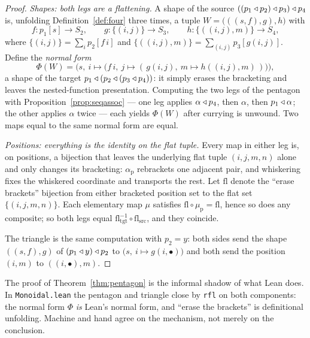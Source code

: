 \begin{proof}
\emph{Shapes: both legs are a flattening.} A shape of the source
$((p_1\mathbin{\triangleleft} p_2)\mathbin{\triangleleft} p_3)\mathbin{\triangleleft} p_4$ is, unfolding
Definition~\ref{def:four} three times, a tuple $W=\bigl(((s,f),g),h\bigr)$ with
\[
 f\colon p_1[s]\to S_2,\qquad
 g\colon\{(i,j)\}\to S_3,\qquad
 h\colon\{((i,j),m)\}\to S_4,
\]
where $\{(i,j)\}=\sum_i p_2[f\,i]$ and $\{((i,j),m)\}=\sum_{(i,j)}p_3[g(i,j)]$.
Define the \emph{normal form}
\[
  \Phi(W)=\bigl(s,\ i\mapsto\bigl(f\,i,\ j\mapsto (\,g(i,j),\ m\mapsto
   h((i,j),m)\,)\bigr)\bigr),
\]
a shape of the target $p_1\mathbin{\triangleleft}(p_2\mathbin{\triangleleft}(p_3\mathbin{\triangleleft} p_4))$: it simply erases the
bracketing and leaves the nested-function presentation. Computing the two legs
of the pentagon with Proposition~\ref{prop:seqassoc} --- one leg applies
$\alpha\mathbin{\triangleleft} p_4$, then $\alpha$, then $p_1\mathbin{\triangleleft}\alpha$; the other applies
$\alpha$ twice --- each yields $\Phi(W)$ after currying is unwound. Two maps
equal to the same normal form are equal.

\emph{Positions: everything is the identity on the flat tuple.} Every map in
either leg is, on positions, a bijection that leaves the underlying flat tuple
$(i,j,m,n)$ alone and only changes its bracketing: $\alpha_{\mathrm p}$
rebrackets one adjacent pair, and whiskering fixes the whiskered coordinate and
transports the rest. Let $\mathrm{fl}$ denote the ``erase brackets'' bijection
from either bracketed position set to the flat set $\{(i,j,m,n)\}$. Each
elementary map $\mu$ satisfies $\mathrm{fl}\circ\mu_{\mathrm p}=\mathrm{fl}$,
hence so does any composite; so both legs equal
$\mathrm{fl}_{\mathrm{tgt}}^{-1}\circ\mathrm{fl}_{\mathrm{src}}$, and they
coincide.

The triangle is the same computation with $p_2=y$: both sides send the shape
$((s,f),g)$ of $(p_1\mathbin{\triangleleft} y)\mathbin{\triangleleft} p_2$ to $\bigl(s,\ i\mapsto g(i,\bullet)\bigr)$
and both send the position $(i,m)$ to $((i,\bullet),m)$.
\end{proof}

\begin{Remark}
The proof of Theorem~\ref{thm:pentagon} is the informal shadow of what Lean
does. In \texttt{Monoidal.lean} the pentagon and triangle close by \texttt{rfl}
on both components: the normal form $\Phi$ \emph{is} Lean's normal form, and
``erase the brackets'' is definitional unfolding. Machine and hand agree on the
mechanism, not merely on the conclusion.
\end{Remark}

